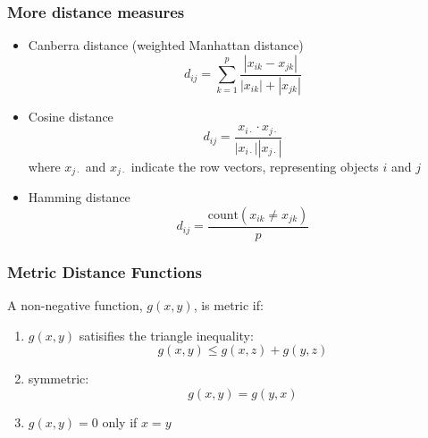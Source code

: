 \documentclass{beamer}
\begin{document}
\begin{frame}
  \frametitle{More distance measures}


\begin{itemize}

\item Canberra distance (weighted Manhattan distance)
\[
d_{ij} = \sum_{k=1}^p \frac{| x_{ik} - x_{jk} |}{|x_{ik}| + |x_{jk}|}
\]

\item Cosine distance
\[
d_{ij} = \frac{x_{i\cdot} \cdot x_{j\cdot}}{|x_{i\cdot}||x_{j\cdot}|}
\]
where $x_{j\cdot}$ and $x_{j\cdot}$ indicate the row vectors, representing objects $i$ and $j$

\item Hamming distance
\[
d_{ij} = \frac{\text{count}(x_{ik} \neq x_{jk})}{p}
\]

\end{itemize}
\end{frame}


\begin{frame}
  \frametitle{Metric  Distance Functions}

A non-negative function, $g(x,y)$, is \alert{metric} if:

\begin{enumerate}

\item $g(x,y)$ satisifies the triangle inequality:
\[
g(x,y) \leq  g(x,z) + g(y,z)
\]

\item symmetric:
\[
g(x,y) = g(y,x)
\] 

\item $g(x,y) =0$ only if $x = y$



\end{enumerate}
\end{frame}
\end{document}
